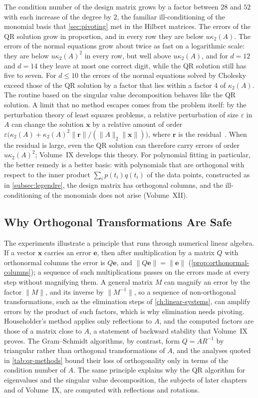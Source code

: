 The condition number of the design matrix grows by a factor between $28$ and $52$ with each increase of the degree by $2$, the familiar ill-conditioning of the monomial basis that \cref{sec:pivoting} met in the Hilbert matrices. The errors of the QR solution grow in proportion, and in every row they are below $u\kappa_2(A)$. The errors of the normal equations grow about twice as fast on a logarithmic scale: they are below $u\kappa_2(A)^2$ in every row, but well above $u\kappa_2(A)$, and for $d=12$ and $d=14$ they leave at most one correct digit, while the QR solution still has five to seven. For $d\le10$ the errors of the normal equations solved by Cholesky exceed those of the QR solution by a factor that lies within a factor $4$ of $\kappa_2(A)$. The routine based on the singular value decomposition behaves like the QR solution. A limit that no method escapes comes from the problem itself: by the perturbation theory of least squares problems, a relative perturbation of size $\varepsilon$ in $A$ can change the solution $\mathbf x$ by a relative amount of order $\varepsilon\bigl(\kappa_2(A)+\kappa_2(A)^2\|\mathbf r\|/(\|A\|_2\|\mathbf x\|)\bigr)$, where $\mathbf r$ is the residual~\cite[Chap.~20]{higham2002accuracy}. When the residual is large, even the QR solution can therefore carry errors of order $u\kappa_2(A)^2$; Volume~IX develops this theory. For polynomial fitting in particular, the better remedy is a better basis: with polynomials that are orthogonal with respect to the inner product $\sum_ip(t_i)q(t_i)$ of the data points, constructed as in \cref{subsec:legendre}, the design matrix has orthogonal columns, and the ill-conditioning of the monomials does not arise (Volume~XII).

\subsection{Why Orthogonal Transformations Are Safe}

The experiments illustrate a principle that runs through numerical linear algebra. If a vector $\mathbf x$ carries an error $\mathbf e$, then after multiplication by a matrix $Q$ with orthonormal columns the error is $Q\mathbf e$, and $\|Q\mathbf e\|=\|\mathbf e\|$ (\cref{prop:orthonormal-columns}); a sequence of such multiplications passes on the errors made at every step without magnifying them. A general matrix $M$ can magnify an error by the factor $\|M\|$, and its inverse by $\|M^{-1}\|$, so a sequence of non-orthogonal transformations, such as the elimination steps of \cref{ch:linear-systems}, can amplify errors by the product of such factors, which is why elimination needs pivoting. Householder's method applies only reflections to $A$, and the computed factors are those of a matrix close to $A$, a statement of backward stability that Volume~IX proves. The Gram--Schmidt algorithms, by contrast, form $Q=AR^{-1}$ by triangular rather than orthogonal transformations of $A$, and the analyses quoted in \cref{tab:qr-methods} bound their loss of orthogonality only in terms of the condition number of $A$. The same principle explains why the QR algorithm for eigenvalues and the singular value decomposition, the subjects of later chapters and of Volume~IX, are computed with reflections and rotations.

